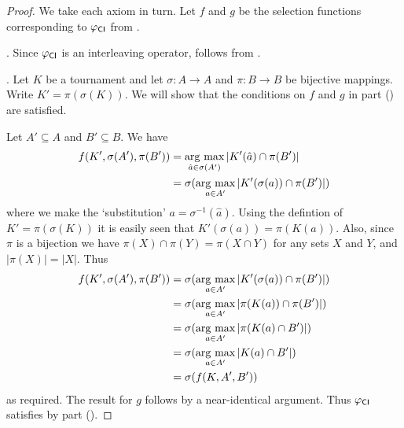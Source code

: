 \begin{proof}

    We take each axiom in turn. Let $f$ and $g$ be the selection functions
    corresponding to ${\varphi_{\mathsf{CI}}}$ from .

    \chaindef{}. Since ${\varphi_{\mathsf{CI}}}$ is an interleaving operator,
    \chaindef{} follows from .

    \anon{}. Let $K$ be a tournament and let $\sigma: A \to A$ and $\pi:
    B \to B$ be bijective mappings. Write $K' = \pi(\sigma(K))$. We will show
    that the conditions on $f$ and $g$ in
     part
    () are satisfied.

    Let $A' \subseteq A$ and $B' \subseteq B$. We have
    \begin{align*}
        f(K', \sigma(A'), \pi(B'))
        &= \operatorname*{arg\ max}_{\hat{a} \in \sigma(A')}{|K'(\hat{a}) \cap \pi(B')|} \\
        &= \sigma(\operatorname*{arg\ max}_{a \in A'}{|K'(\sigma(a)) \cap \pi(B')|})
    \end{align*}
    where we make the `substitution' $a = \sigma^{-1}(\hat{a})$. Using the
    defintion of $K' = \pi(\sigma(K))$ it is easily seen that $K'(\sigma(a)) =
    \pi(K(a))$. Also, since $\pi$ is a bijection we have $\pi(X) \cap \pi(Y) =
    \pi(X \cap Y)$ for any sets $X$ and $Y$, and $|\pi(X)| = |X|$. Thus
    \begin{align*}
        f(K', \sigma(A'), \pi(B'))
        &= \sigma(\operatorname*{arg\ max}_{a \in A'}{|K'(\sigma(a)) \cap \pi(B')|}) \\
        &= \sigma(\operatorname*{arg\ max}_{a \in A'}{|\pi(K(a)) \cap \pi(B')|}) \\
        &= \sigma(\operatorname*{arg\ max}_{a \in A'}{|\pi(K(a) \cap B')|}) \\
        &= \sigma(\operatorname*{arg\ max}_{a \in A'}{|K(a) \cap B'|}) \\
        &= \sigma(f(K, A', B'))
    \end{align*}
    as required. The result for $g$ follows by a near-identical argument. Thus
    ${\varphi_{\mathsf{CI}}}$ satisfies \anon{} by
     part
    ().


\end{proof}
